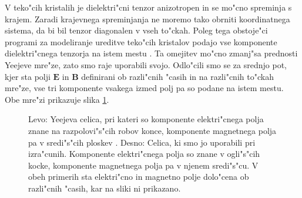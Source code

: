 \documentclass[12pt,twoside,openright,final,a4paper]{report}
\renewcommand{\vec}{\mathbf}
\newcommand{\E}{\vec E}
\newcommand{\B}{\vec B}
\begin{document}
V teko"cih kristalih je dielektri"cni tenzor anizotropen in se mo"cno spreminja s krajem. 
Zaradi krajevnega spreminjanja ne moremo tako obrniti koordinatnega sistema, da bi bil tenzor diagonalen v vseh to"ckah. 
Poleg tega obstoje"ci programi za modeliranje ureditve teko"cih kristalov podajo vse komponente dielektri"cnega tenzorja na istem mestu \cite{ravnik-zumer-ldg}.
Ta omejitev mo"cno zmanj"sa prednosti Yeejeve mre"ze, zato smo raje uporabili svojo. 
Odlo"cili smo se za srednjo pot, kjer sta polji $\E$ in $\B$ definirani ob razli"cnih "casih in na razli"cnih to"ckah mre"ze, vse tri komponente vsakega izmed polj pa so podane na istem mestu. 
Obe mre"zi prikazuje slika \ref{fig:lattice}. 

\begin{figure}[h]
\centering
\caption{Levo: Yeejeva celica, pri kateri so komponente elektri"cnega polja znane na razpolovi"s"cih robov konce, komponente magnetnega polja pa v sredi"s"cih ploskev \cite{yee-lattice}. Desno: Celica, ki smo jo uporabili pri izra"cunih. Komponente elektri"cnega polja so znane v ogli"s"cih kocke, komponente magnetnega polja pa v njenem sredi"s"cu. V obeh primerih sta elektri"cno in magnetno polje dolo"cena ob razli"cnih "casih, kar na sliki ni prikazano.}
\label{fig:lattice}
\end{figure}
\end{document}
